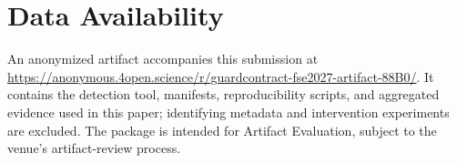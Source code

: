 \section*{Data Availability}
\label{sec:data-availability}
\begin{sloppypar}
An anonymized artifact accompanies this submission at
\url{https://anonymous.4open.science/r/guardcontract-fse2027-artifact-88B0/}.
It contains the detection tool, manifests, reproducibility scripts, and
aggregated evidence used in this paper; identifying metadata and intervention
experiments are excluded. The package is intended for Artifact Evaluation,
subject to the venue's artifact-review process.
\end{sloppypar}

